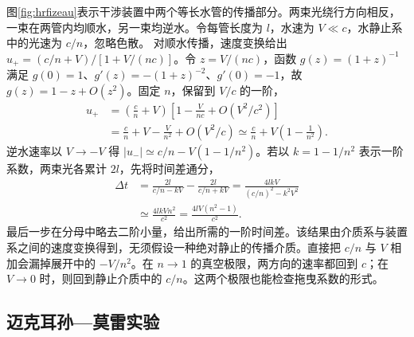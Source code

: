 图\ref{fig:hrfizeau}表示干涉装置中两个等长水管的传播部分。两束光绕行方向相反，一束在两管内均顺水，另一束均逆水。令每管长度为 $l$，水速为 $V\ll c$，水静止系中的光速为 $c/n$，忽略色散。
对顺水传播，速度变换给出 $u_+=(c/n+V)/[1+V/(nc)]$。令 $z=V/(nc)$，函数 $g(z)=(1+z)^{-1}$ 满足 $g(0)=1$、$g'(z)=-(1+z)^{-2}$、$g'(0)=-1$，故 $g(z)=1-z+O(z^2)$。固定 $n$，保留到 $V/c$ 的一阶，
\begin{align*}
 u_+&=\left(\frac cn+V\right)\left[1-\frac V{nc}+O(V^2/c^2)\right]\\
 &=\frac cn+V-\frac V{n^2}+O(V^2/c)
 \simeq\frac cn+V\left(1-\frac1{n^2}\right).
\end{align*}
逆水速率以 $V\to-V$ 得 $|u_-|\simeq c/n-V(1-1/n^2)$。若以 $k=1-1/n^2$ 表示一阶系数，两束光各累计 $2l$，先将时间差通分，
\begin{align*}
 \Delta t&=\frac{2l}{c/n-kV}-\frac{2l}{c/n+kV}
 =\frac{4lkV}{(c/n)^2-k^2V^2}\\
 &\simeq\frac{4lkVn^2}{c^2}=\frac{4lV(n^2-1)}{c^2}.
\end{align*}
最后一步在分母中略去二阶小量，给出所需的一阶时间差。该结果由介质系与装置系之间的速度变换得到，无须假设一种绝对静止的传播介质。直接把 $c/n$ 与 $V$ 相加会漏掉展开中的 $-V/n^2$。在 $n\to1$ 的真空极限，两方向的速率都回到 $c$；在 $V\to0$ 时，则回到静止介质中的 $c/n$。这两个极限也能检查拖曳系数的形式。

\subsection{迈克耳孙—莫雷实验}

